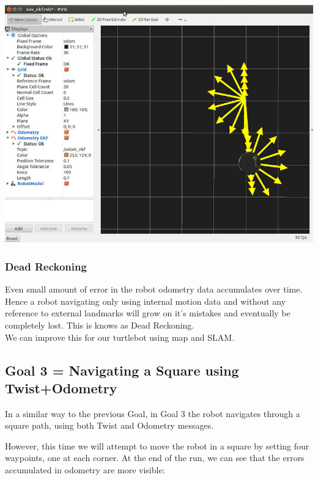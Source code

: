 \documentclass[10pt,a4paper]{article}
\begin{document}
\begin{center}
\includegraphics[width=\textwidth]{images/odom_out_and_back.jpg}\\
\end{center}

\subsubsection{Dead Reckoning}
Even small amount of error in the robot odometry data accumulates over time. Hence a robot navigating only using internal motion data and without any reference to external landmarks will grow on it's mistakes and eventually be completely lost. This is knows as Dead Reckoning. \\
We can improve this for our turtlebot using map and SLAM.

\subsection{Goal 3 = Navigating a Square using Twist+Odometry}
In a similar way to the previous Goal, in Goal 3 the robot navigates through a square path, using both Twist and Odometry messages.

However, this time we will attempt to move the robot in a square by setting four waypoints, one at each corner. At the end of the run, we can see that the errors accumulated in odometry are more visible:
\end{document}
